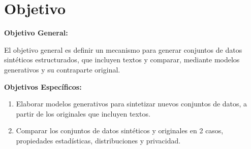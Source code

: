 \section{Objetivo}
\textbf{Objetivo General:}

El objetivo general es definir un mecanismo para generar conjuntos de datos sintéticos estructurados, que incluyen textos y comparar, mediante modelos generativos y su contraparte original.

\textbf{Objetivos Específicos:} 
\begin{enumerate}
    \item Elaborar modelos generativos para sintetizar nuevos conjuntos de datos, a partir de los originales que incluyen textos.
    \item Comparar los conjuntos de datos sintéticos y originales en 2 casos, propiedades estadísticas, distribuciones y privacidad.
\end{enumerate}
